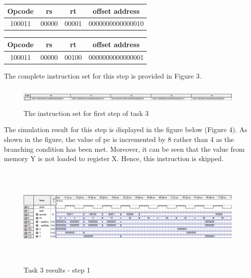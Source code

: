 \documentclass[12pt,a4paper]{article}
\begin{document}
	\begin{table}[H]
		\centering
		\begin{tabular}{|c | c| c| c|}
			\hline
			\textbf{Opcode} & \textbf{rs} & \textbf{rt}& \textbf{offset address}\\ \hline
			100011& 00000 & 00001 & 0000000000000010\\\hline
		\end{tabular}
	\end{table}

\vspace{-0.5cm}

	\begin{table}[H]
		\centering
		\begin{tabular}{|c | c| c| c|}
			\hline
			\textbf{Opcode} & \textbf{rs} & \textbf{rt}& \textbf{offset address}\\ \hline
			100011& 00000 & 00100 & 0000000000000001\\\hline
		\end{tabular}
	\end{table}
	 
	\noindent The complete instruction set for this step is provided in Figure 3.
	
	\begin{figure}[H]
		\centering
		\includegraphics[height=1cm,width=14cm]{figures/code2.png}
		\caption{The instruction set for first step of task 3}
	\end{figure}

	\noindent The simulation result for this step is displayed in the figure below (Figure 4). As shown in the figure, the value of pc is incremented by 8 rather than 4 as the branching condition has been met. Moreover, it can be seen that the value from memory Y is not loaded to register X. Hence, this instruction is skipped.
	
	\begin{figure}[H]
		\centering
		\includegraphics[height=5cm,width=15cm]{figures/simulations2.png}
		\caption{Task 3 results - step 1}
	\end{figure}
\end{document}
